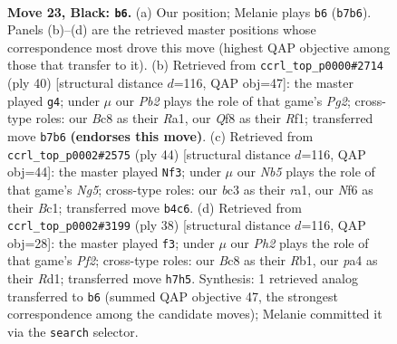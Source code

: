 \documentclass[11pt]{article}
\begin{document}
\clearpage

\begin{figure}[p]\centering
\begin{subfigure}{0.46\textwidth}\centering
\resizebox{\linewidth}{!}{%
\newchessgame
\chessboard[
  setfen={2b2q2/1p3pkp/r4np1/p7/Pn6/NPB3PN/5PBP/R3R1K1 b - - 2 23},
  showmover=false,
  pgfstyle=straightmove, color=movearrow, markmove={b7-b6}
]}
\caption{}
\end{subfigure}\hfill
\begin{subfigure}{0.46\textwidth}\centering
\resizebox{\linewidth}{!}{%
\newchessgame
\chessboard[
  setfen={r3r1k1/pp4pp/1n1P1qb1/2b2N2/2p2B2/2N5/PPQ3PP/R4R1K w - - 0 21},
  showmover=false,
  pgfstyle=straightmove, color=movearrow, markmove={g2-g4}
]}
\caption{}
\end{subfigure}
\\[4pt]
\begin{subfigure}{0.46\textwidth}\centering
\resizebox{\linewidth}{!}{%
\newchessgame
\chessboard[
  setfen={5rk1/3qppb1/2b2npp/6N1/1R5P/2NP2P1/2Q1PP2/r1B2RK1 w - - 0 23},
  showmover=false,
  pgfstyle=straightmove, color=movearrow, markmove={g5-f3}
]}
\caption{}
\end{subfigure}\hfill
\begin{subfigure}{0.46\textwidth}\centering
\resizebox{\linewidth}{!}{%
\newchessgame
\chessboard[
  setfen={2r1r1k1/ppp3pp/1nn5/5b2/1b2NN2/4B1P1/P3PPBP/1R1R2K1 w - - 1 20},
  showmover=false,
  pgfstyle=straightmove, color=movearrow, markmove={f2-f3}
]}
\caption{}
\end{subfigure}
\caption{\textbf{Move 23, Black: \texttt{b6}.} (a) Our position; Melanie plays \texttt{b6} (\texttt{b7b6}). Panels (b)--(d) are the retrieved master positions whose correspondence most drove this move (highest QAP objective among those that transfer to it). (b) Retrieved from \texttt{ccrl\_top\_p0000\#2714} (ply 40) [structural distance $d$=116, QAP obj=47]: the master played \texttt{g4}; under $\mu$ our \emph{Pb2} plays the role of that game's \emph{Pg2}; cross-type roles: our \emph{B}c8 as their \emph{R}a1, our \emph{Q}f8 as their \emph{R}f1; transferred move \texttt{b7b6} \textbf{(endorses this move)}. (c) Retrieved from \texttt{ccrl\_top\_p0002\#2575} (ply 44) [structural distance $d$=116, QAP obj=44]: the master played \texttt{Nf3}; under $\mu$ our \emph{Nb5} plays the role of that game's \emph{Ng5}; cross-type roles: our \emph{b}c3 as their \emph{r}a1, our \emph{N}f6 as their \emph{B}c1; transferred move \texttt{b4c6}. (d) Retrieved from \texttt{ccrl\_top\_p0002\#3199} (ply 38) [structural distance $d$=116, QAP obj=28]: the master played \texttt{f3}; under $\mu$ our \emph{Ph2} plays the role of that game's \emph{Pf2}; cross-type roles: our \emph{B}c8 as their \emph{R}b1, our \emph{p}a4 as their \emph{R}d1; transferred move \texttt{h7h5}. Synthesis: 1 retrieved analog transferred to \texttt{b6} (summed QAP objective 47, the strongest correspondence among the candidate moves); Melanie committed it via the \texttt{search} selector.}
\label{fig:thought-m45}
\end{figure}
\end{document}
